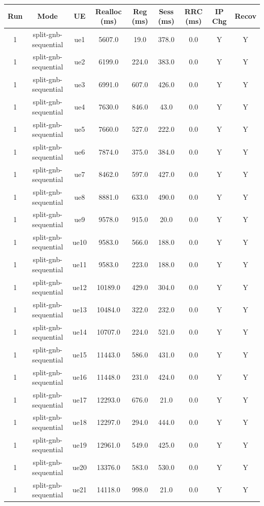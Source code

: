 \begin{table}[ht]
\centering
\begin{tabular}{|c|c|c|c|c|c|c|c|c|}
\hline
Run & Mode & UE & Realloc (ms) & Reg (ms) & Sess (ms) & RRC (ms) & IP Chg & Recov \\
\hline
1 & split-gnb-sequential & ue1 & 5607.0 & 19.0 & 378.0 & 0.0 & Y & Y \\
1 & split-gnb-sequential & ue2 & 6199.0 & 224.0 & 383.0 & 0.0 & Y & Y \\
1 & split-gnb-sequential & ue3 & 6991.0 & 607.0 & 426.0 & 0.0 & Y & Y \\
1 & split-gnb-sequential & ue4 & 7630.0 & 846.0 & 43.0 & 0.0 & Y & Y \\
1 & split-gnb-sequential & ue5 & 7660.0 & 527.0 & 222.0 & 0.0 & Y & Y \\
1 & split-gnb-sequential & ue6 & 7874.0 & 375.0 & 384.0 & 0.0 & Y & Y \\
1 & split-gnb-sequential & ue7 & 8462.0 & 597.0 & 427.0 & 0.0 & Y & Y \\
1 & split-gnb-sequential & ue8 & 8881.0 & 633.0 & 490.0 & 0.0 & Y & Y \\
1 & split-gnb-sequential & ue9 & 9578.0 & 915.0 & 20.0 & 0.0 & Y & Y \\
1 & split-gnb-sequential & ue10 & 9583.0 & 566.0 & 188.0 & 0.0 & Y & Y \\
1 & split-gnb-sequential & ue11 & 9583.0 & 223.0 & 188.0 & 0.0 & Y & Y \\
1 & split-gnb-sequential & ue12 & 10189.0 & 429.0 & 304.0 & 0.0 & Y & Y \\
1 & split-gnb-sequential & ue13 & 10484.0 & 322.0 & 232.0 & 0.0 & Y & Y \\
1 & split-gnb-sequential & ue14 & 10707.0 & 224.0 & 521.0 & 0.0 & Y & Y \\
1 & split-gnb-sequential & ue15 & 11443.0 & 586.0 & 431.0 & 0.0 & Y & Y \\
1 & split-gnb-sequential & ue16 & 11448.0 & 231.0 & 424.0 & 0.0 & Y & Y \\
1 & split-gnb-sequential & ue17 & 12293.0 & 676.0 & 21.0 & 0.0 & Y & Y \\
1 & split-gnb-sequential & ue18 & 12297.0 & 294.0 & 444.0 & 0.0 & Y & Y \\
1 & split-gnb-sequential & ue19 & 12961.0 & 549.0 & 425.0 & 0.0 & Y & Y \\
1 & split-gnb-sequential & ue20 & 13376.0 & 583.0 & 530.0 & 0.0 & Y & Y \\
1 & split-gnb-sequential & ue21 & 14118.0 & 998.0 & 21.0 & 0.0 & Y & Y \\

\end{tabular}
\end{table}
